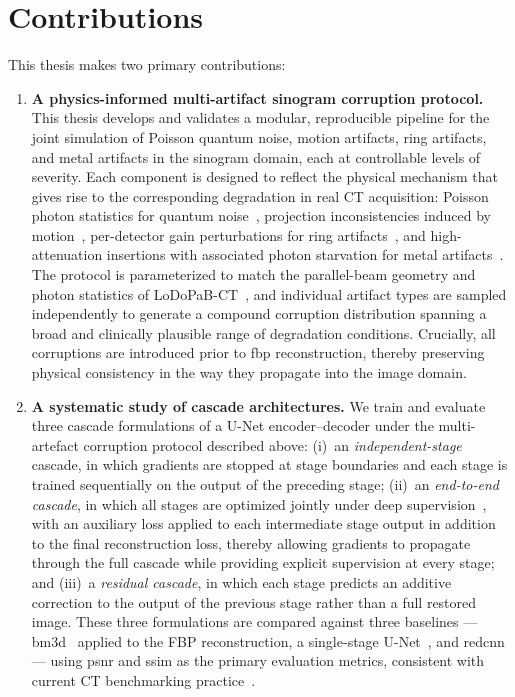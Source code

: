 \section{Contributions}
\label{sec:intro_contributions}

This thesis makes two primary contributions:

\begin{enumerate}
    \item \textbf{A physics-informed multi-artifact sinogram corruption protocol.} This thesis develops and validates a modular, reproducible pipeline for the joint simulation of Poisson quantum noise, motion artifacts, ring artifacts, and metal artifacts in the sinogram domain, each at controllable levels of severity. Each component is designed to reflect the physical mechanism that gives rise to the corresponding degradation in real CT acquisition: Poisson photon statistics for quantum noise~\cite{Leuschner2021}, projection inconsistencies induced by motion~\cite{LuMackie2002, Lu2005}, per-detector gain perturbations for ring artifacts~\cite{Sijbers2004, Prell2009}, and high-attenuation insertions with associated photon starvation for metal artifacts~\cite{ZhangYu2018, Gjesteby2016}. The protocol is parameterized to match the parallel-beam geometry and photon statistics of LoDoPaB-CT~\cite{Leuschner2021}, and individual artifact types are sampled independently to generate a compound corruption distribution spanning a broad and clinically plausible range of degradation conditions. Crucially, all corruptions are introduced prior to \gls{fbp} reconstruction, thereby preserving physical consistency in the way they propagate into the image domain.

    \item \textbf{A systematic study of cascade architectures.} We train and evaluate three cascade formulations of a U-Net encoder--decoder under the multi-artefact corruption protocol described above: (i)~an \emph{independent-stage} cascade, in which gradients are stopped at stage boundaries and each stage is trained sequentially on the output of the preceding stage; (ii)~an \emph{end-to-end cascade}, in which all stages are optimized jointly under deep supervision~\cite{Lee2015DSN}, with an auxiliary loss applied to each intermediate stage output in addition to the final reconstruction loss, thereby allowing gradients to propagate through the full cascade while providing explicit supervision at every stage; and (iii)~a \emph{residual cascade}, in which each stage predicts an additive correction to the output of the previous stage rather than a full restored image. These three formulations are compared against three baselines --- \gls{bm3d}~\cite{Dabov2007} applied to the FBP reconstruction, a single-stage U-Net~\cite{Ronneberger2015}, and \gls{redcnn}~\cite{Chen2017} --- using \gls{psnr} and \gls{ssim} as the primary evaluation metrics, consistent with current CT benchmarking practice~\cite{Kiss2024}.
\end{enumerate}

